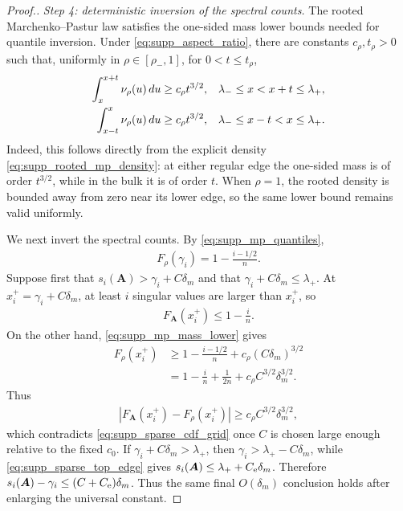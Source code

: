 \documentclass[numsec,webpdf,modern,large,namedate]{oup-authoring-template}
\theoremstyle{plain}
\theoremstyle{remark}
\newif\ifmarkchanges
\newenvironment{revision}{\begingroup\ifmarkchanges\color{red}\fi}{\endgroup}
\begin{document}
\begin{revision}
\begin{proof}[Proof.]
\textit{Step 4: deterministic inversion of the spectral counts.}
The rooted Marchenko--Pastur law satisfies the one-sided mass lower bounds
needed for quantile inversion.  Under \eqref{eq:supp_aspect_ratio}, there are
constants $c_\rho,t_\rho>0$ such that, uniformly in
$\rho\in[\rho_-,1]$, for $0<t\le t_\rho$,
\begin{align}
\label{eq:supp_mp_mass_lower}
    \int_x^{x+t}\nu_\rho(u)\,du
    &\ge c_\rho t^{3/2},
    &&\lambda_-\le x<x+t\le\lambda_+,\notag\\
    \int_{x-t}^{x}\nu_\rho(u)\,du
    &\ge c_\rho t^{3/2},
    &&\lambda_-\le x-t<x\le\lambda_+.
\end{align}
Indeed, this follows directly from the explicit density
\eqref{eq:supp_rooted_mp_density}: at either regular edge the one-sided mass
is of order $t^{3/2}$, while in the bulk it is of order $t$.  When
$\rho=1$, the rooted density is bounded away from zero near its lower edge,
so the same lower bound remains valid uniformly.

We next invert the spectral counts.  By
\eqref{eq:supp_mp_quantiles},
\begin{align*}
    F_\rho(\gamma_i)=1-\frac{i-1/2}{n}.
\end{align*}
Suppose first that
$s_i(\bm A)>\gamma_i+C\delta_m$ and that
$\gamma_i+C\delta_m\le\lambda_+$.  At
$x_i^+=\gamma_i+C\delta_m$, at least $i$ singular values are larger than
$x_i^+$, so
\begin{align*}
    F_{\bm A}(x_i^+)\le1-\frac{i}{n}.
\end{align*}
On the other hand, \eqref{eq:supp_mp_mass_lower} gives
\begin{align*}
    F_\rho(x_i^+)
    &\ge1-\frac{i-1/2}{n}+c_\rho(C\delta_m)^{3/2}\\
    &=1-\frac{i}{n}+\frac{1}{2n}
      +c_\rho C^{3/2}\delta_m^{3/2}.
\end{align*}
Thus
\begin{align*}
    |F_{\bm A}(x_i^+)-F_\rho(x_i^+)|
    \ge c_\rho C^{3/2}\delta_m^{3/2},
\end{align*}
which contradicts \eqref{eq:supp_sparse_cdf_grid} once $C$ is chosen large
enough relative to the fixed $c_0$.  If
$\gamma_i+C\delta_m>\lambda_+$, then
$\gamma_i>\lambda_+-C\delta_m$, while
\eqref{eq:supp_sparse_top_edge} gives
$s_i(\bm A)\le\lambda_++C_{\rm e}\delta_m$.  Therefore
$s_i(\bm A)-\gamma_i\le(C+C_{\rm e})\delta_m$.  Thus the same final
$O(\delta_m)$ conclusion holds after enlarging the universal constant.


\end{proof}
\end{revision}
\end{document}
